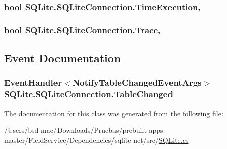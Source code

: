 \hypertarget{class_s_q_lite_1_1_s_q_lite_connection_af925b9fddec261394ab29fbbaa25d9a0}{
\subsubsection[{Time\+Execution}]{\setlength{\rightskip}{0pt plus 5cm}bool S\+Q\+Lite.\+S\+Q\+Lite\+Connection.\+Time\+Execution\hspace{0.3cm}{\ttfamily [get]}, {\ttfamily [set]}}}\label{class_s_q_lite_1_1_s_q_lite_connection_af925b9fddec261394ab29fbbaa25d9a0}
\hypertarget{class_s_q_lite_1_1_s_q_lite_connection_af9e92ae222dba65b2ab761139531118a}{
\subsubsection[{Trace}]{\setlength{\rightskip}{0pt plus 5cm}bool S\+Q\+Lite.\+S\+Q\+Lite\+Connection.\+Trace\hspace{0.3cm}{\ttfamily [get]}, {\ttfamily [set]}}}\label{class_s_q_lite_1_1_s_q_lite_connection_af9e92ae222dba65b2ab761139531118a}


\subsection{Event Documentation}
\hypertarget{class_s_q_lite_1_1_s_q_lite_connection_a17fd06674a40bf6bf7630b65503eafa9}{
\subsubsection[{Table\+Changed}]{\setlength{\rightskip}{0pt plus 5cm}Event\+Handler$<${\bf Notify\+Table\+Changed\+Event\+Args}$>$ S\+Q\+Lite.\+S\+Q\+Lite\+Connection.\+Table\+Changed}}\label{class_s_q_lite_1_1_s_q_lite_connection_a17fd06674a40bf6bf7630b65503eafa9}


The documentation for this class was generated from the following file\+:\begin{DoxyCompactItemize}
\item 
/\+Users/bsd-\/mac/\+Downloads/\+Pruebas/prebuilt-\/apps-\/master/\+Field\+Service/\+Dependencies/sqlite-\/net/src/\hyperlink{_s_q_lite_8cs}{S\+Q\+Lite.\+cs}\end{DoxyCompactItemize}
